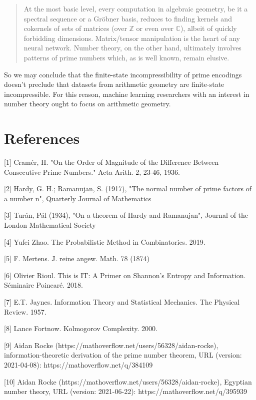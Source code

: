 \documentclass{article}
\begin{document}
\begin{quote}
At the most basic level, every computation in algebraic
geometry, be it a spectral sequence or a Gröbner basis, reduces to finding kernels and cokernels of sets of matrices (over $\mathbb{Z}$ or even over $\mathbb{C}$), albeit of quickly forbidding dimensions. Matrix/tensor manipulation is the heart of any neural network. Number theory, on the other hand, ultimately involves patterns of prime numbers which, as is well known, remain elusive.
\end{quote}

So we may conclude that the finite-state incompressibility of prime encodings doesn't preclude that datasets from arithmetic geometry are finite-state incompressible. For this reason, machine learning researchers with an interest in number theory ought to focus on arithmetic geometry. 

\section*{References}

\small

[1] Cramér, H. "On the Order of Magnitude of the Difference Between Consecutive Prime Numbers." Acta Arith. 2, 23-46, 1936.

[2] Hardy, G. H.; Ramanujan, S. (1917), "The normal number of prime factors of a number n", Quarterly Journal of Mathematics

[3] Turán, Pál (1934), "On a theorem of Hardy and Ramanujan", Journal of the London Mathematical Society

[4] Yufei Zhao. The Probabilistic Method in Combinatorics. 2019.

[5] F. Mertens. J. reine angew. Math. 78 (1874)

[6] Olivier Rioul. This is IT: A Primer on Shannon’s Entropy and Information. Séminaire Poincaré. 2018.

[7] E.T. Jaynes. Information Theory and Statistical Mechanics. The Physical Review. 1957.

[8] Lance Fortnow. Kolmogorov Complexity. 2000.

[9] Aidan Rocke (https://mathoverflow.net/users/56328/aidan-rocke), information-theoretic derivation of the prime number theorem, URL (version: 2021-04-08): https://mathoverflow.net/q/384109

[10] Aidan Rocke (https://mathoverflow.net/users/56328/aidan-rocke), Egyptian number theory, URL (version: 2021-06-22): https://mathoverflow.net/q/395939
\end{document}
